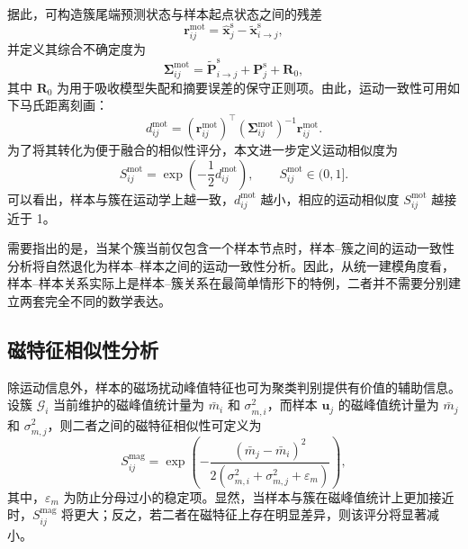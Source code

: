 \documentclass{xdupgthesis}
\begin{document}
据此，可构造簇尾端预测状态与样本起点状态之间的残差
\begin{equation}
	\mathbf{r}_{ij}^{\mathrm{mot}}
	=
	\hat{\mathbf{x}}_j^{\mathrm{s}}
	-
	\tilde{\mathbf{x}}_{i\rightarrow j}^{\mathrm{s}},
\end{equation}
并定义其综合不确定度为
\begin{equation}
	\mathbf{\Sigma}_{ij}^{\mathrm{mot}}
	=
	\tilde{\mathbf{P}}_{i\rightarrow j}^{\mathrm{s}}
	+
	\mathbf{P}_j^{\mathrm{s}}
	+
	\mathbf{R}_0,
\end{equation}
其中 $\mathbf{R}_0$ 为用于吸收模型失配和摘要误差的保守正则项。由此，运动一致性可用如下马氏距离刻画：
\begin{equation}
	d_{ij}^{\mathrm{mot}}
	=
	\left(\mathbf{r}_{ij}^{\mathrm{mot}}\right)^{\top}
	\left(\mathbf{\Sigma}_{ij}^{\mathrm{mot}}\right)^{-1}
	\mathbf{r}_{ij}^{\mathrm{mot}}.
\end{equation}
为了将其转化为便于融合的相似性评分，本文进一步定义运动相似度为
\begin{equation}
	S_{ij}^{\mathrm{mot}}
	=
	\exp\!\left(-\frac{1}{2}d_{ij}^{\mathrm{mot}}\right),
	\qquad
	S_{ij}^{\mathrm{mot}}\in(0,1].
\end{equation}
可以看出，样本与簇在运动学上越一致，$d_{ij}^{\mathrm{mot}}$ 越小，相应的运动相似度 $S_{ij}^{\mathrm{mot}}$ 越接近于 1。

需要指出的是，当某个簇当前仅包含一个样本节点时，样本--簇之间的运动一致性分析将自然退化为样本--样本之间的运动一致性分析。因此，从统一建模角度看，样本--样本关系实际上是样本--簇关系在最简单情形下的特例，二者并不需要分别建立两套完全不同的数学表达。

\subsection{磁特征相似性分析}

除运动信息外，样本的磁场扰动峰值特征也可为聚类判别提供有价值的辅助信息。设簇 $\mathcal{G}_i$ 当前维护的磁峰值统计量为 $\bar m_i$ 和 $\sigma_{m,i}^{2}$，而样本 $\mathbf{u}_j$ 的磁峰值统计量为 $\bar m_j$ 和 $\sigma_{m,j}^{2}$，则二者之间的磁特征相似性可定义为
\begin{equation}
	S_{ij}^{\mathrm{mag}}
	=
	\exp\!\left(
	-\frac{
		(\bar m_j-\bar m_i)^2
	}{
		2\left(\sigma_{m,i}^{2}+\sigma_{m,j}^{2}+\varepsilon_m\right)
	}
	\right),
\end{equation}
其中，$\varepsilon_m$ 为防止分母过小的稳定项。显然，当样本与簇在磁峰值统计上更加接近时，$S_{ij}^{\mathrm{mag}}$ 将更大；反之，若二者在磁特征上存在明显差异，则该评分将显著减小。
\end{document}
